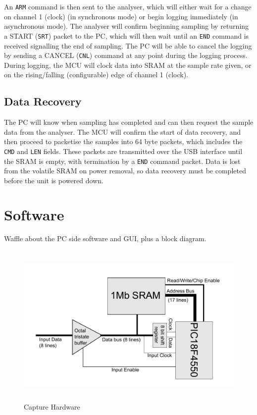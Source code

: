 \documentclass[11pt]{article}
\begin{document}
    An \texttt{ARM} command is then sent to the analyser, which will either wait
    for a change on channel 1 (clock) (in synchronous mode) or begin logging
    immediately (in asynchronous mode). The analyser will confirm beginning
    sampling by returning a START (\texttt{SRT}) packet to the PC, which 
    will then
    wait until an \texttt{END} command is received signalling the end of
    sampling. The PC will be able to cancel the logging by sending a CANCEL
    (\texttt{CNL}) command at any point during the logging process. During
    logging, the MCU will clock data into SRAM at the sample rate given, or on
    the rising/falling (configurable) edge of channel 1 (clock).

\subsection{Data Recovery}
    The PC will know when sampling has completed and can then request the sample
    data from the analyser. The MCU will confirm the start of data recovery, and
    then proceed to packetise the samples into 64 byte packets, which includes
    the \texttt{CMD} and \texttt{LEN} fields. These packets are transmitted over
    the USB interface until the SRAM is empty, with termination by a
    \texttt{END} command packet. Data is lost from the volatile SRAM on power
    removal, so data recovery must be completed before the unit is powered down.

\section{Software}
    Waffle about the PC side software and GUI, plus a block diagram.
    
    \begin{figure}
    \centering
    \includegraphics[height=8cm]{hardware.pdf}
    \caption{Capture Hardware}
    \label{fig:app}
    \end{figure}
\end{document}

